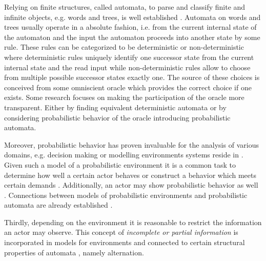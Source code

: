 Relying on finite structures, called automata, to parse and classify finite and
infinite objects, e.g. words and trees, is well established \cite{LangAutoLog,%
AutoInfObj}. Automata on words and trees usually operate in a absolute fashion,
i.e. from the current internal state of the automaton and the input the
automaton proceeds into another state by some rule. These rules can be
categorized to be deterministic or non-deterministic where deterministic rules
uniquely identify one successor state from the current internal state and the
read input while non-deterministic rules allow to choose from multiple possible
successor states exactly one. The source of these choices is conceived from
some omniscient oracle which provides the correct choice if one exists. Some
research focuses on making the participation of the oracle more transparent.
Either by finding equivalent deterministic automata
\cite{NonDetBuechiToDetParity} or by considering probabilistic behavior of the
oracle \cite{RandAutoInfTrees,QualTreeLang,RecOmeLangProbAuto} introducing
probabilistic automata.

Moreover, probabilistic behavior has proven invaluable for the analysis of
various domains, e.g. decision making \cite{ActingOptimallyInPOSD} or modelling
environments systems reside in \cite{PrinciplesOfMC}. Given such a model of a
probabilistic environment it is a common task to determine how well a certain
actor behaves \cite{PrinciplesOfMC} or construct a behavior which meets certain
demands \cite{SynProbEnv,QuanStochParityGames}. Additionally, an actor may show
probabilistic behavior as well \cite{RandomnessForFree}. Connections between
models of probabilistic environments and probabilistic automata are already
established \cite{DecProblemsForProbAuto}.

Thirdly, depending on the environment it is reasonable to restrict the
information an actor may observe. This concept of \emph{incomplete or partial
information} is incorporated in models for environments \cite{QualAnaPOMDP} and
connected to certain structural properties of automata
\cite{ChurchsProblemRevisited}, namely alternation.

